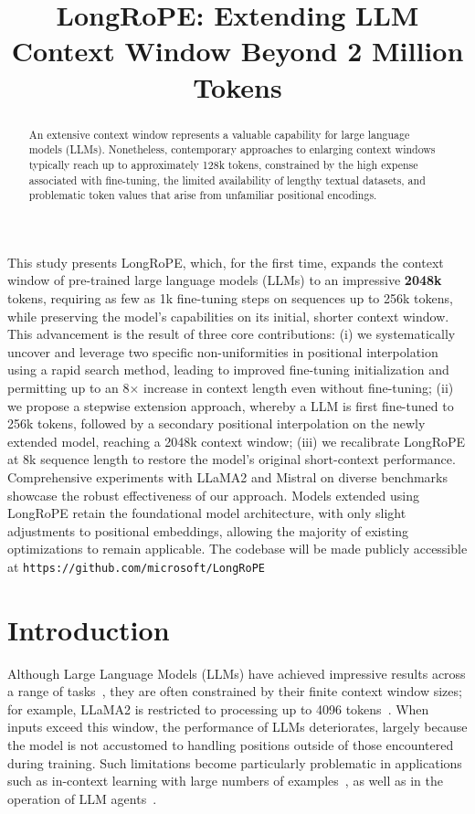 \title{LongRoPE: Extending LLM Context Window Beyond 2 Million Tokens}

\begin{abstract}
An extensive context window represents a valuable capability for large language models (LLMs). Nonetheless, contemporary approaches to enlarging context windows typically reach up to approximately 128k tokens, constrained by the high expense associated with fine-tuning, the limited availability of lengthy textual datasets, and problematic token values that arise from unfamiliar positional encodings.
\end{abstract}

This study presents LongRoPE, which, for the first time, expands the context window of pre-trained large language models (LLMs) to an impressive \textbf{2048k} tokens, requiring as few as 1k fine-tuning steps on sequences up to 256k tokens, while preserving the model’s capabilities on its initial, shorter context window. This advancement is the result of three core contributions: (i) we systematically uncover and leverage two specific non-uniformities in positional interpolation using a rapid search method, leading to improved fine-tuning initialization and permitting up to an 8$\times$ increase in context length even without fine-tuning; (ii) we propose a stepwise extension approach, whereby a LLM is first fine-tuned to 256k tokens, followed by a secondary positional interpolation on the newly extended model, reaching a 2048k context window; (iii) we recalibrate LongRoPE at 8k sequence length to restore the model’s original short-context performance. Comprehensive experiments with LLaMA2 and Mistral on diverse benchmarks showcase the robust effectiveness of our approach. Models extended using LongRoPE retain the foundational model architecture, with only slight adjustments to positional embeddings, allowing the majority of existing optimizations to remain applicable. The codebase will be made publicly accessible at \texttt{https://github.com/microsoft/LongRoPE}

\section{Introduction}

Although Large Language Models (LLMs) have achieved impressive results across a range of tasks~\cite{gpt4,llama2}, they are often constrained by their finite context window sizes; for example, LLaMA2 is restricted to processing up to 4096 tokens~\cite{llama2}. When inputs exceed this window, the performance of LLMs deteriorates, largely because the model is not accustomed to handling positions outside of those encountered during training. Such limitations become particularly problematic in applications such as in-context learning with large numbers of examples~\cite{Huang2023FewerIM}, as well as in the operation of LLM agents~\cite{park2023generative,madaan2023selfrefine}.

